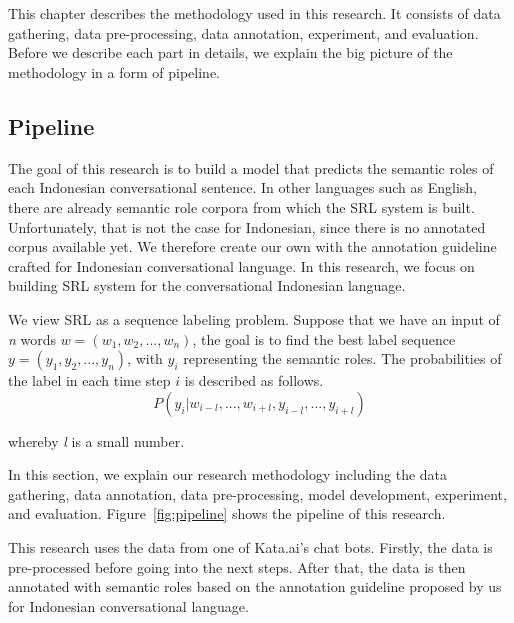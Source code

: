 \chapter{\babTiga}\label{bab:tiga}
This chapter describes the methodology used in this research. It consists of data gathering, data pre-processing, data annotation, experiment, and evaluation. Before we describe each part in details, we explain the big picture of the methodology in a form of pipeline.

\section{Pipeline}
The goal of this research is to build a model that predicts the semantic roles of each Indonesian conversational sentence. In other languages such as English, there are already semantic role corpora from which the SRL system is built. Unfortunately, that is not the case for Indonesian, since there is no annotated corpus available yet. We therefore create our own with the annotation guideline crafted for Indonesian conversational language. In this research, we focus on building SRL system for the conversational Indonesian language. 

We view SRL as a sequence labeling problem. Suppose that we have an input of \textit{n} words $w = (w_{1}, w_{2}, ..., w_{n})$, the goal is to find the best label sequence $y = (y_{1}, y_{2}, ..., y_{n})$, with $y_{i}$ representing the semantic roles. The probabilities of the label in each time step $i$ is described as follows.
\begin{equation}
P(y_{i}|w_{i-l}, ..., w_{i+l},y_{i-l}, ..., y_{i+l})
\end{equation}

whereby \textit{l} is a small number. 

In this section, we explain our research methodology including the data gathering, data annotation, data pre-processing, model development, experiment, and evaluation. Figure~\ref{fig:pipeline} shows the pipeline of this research.

This research uses the data from one of Kata.ai's chat bots. Firstly, the data is pre-processed before going into the next steps. After that, the data is then annotated with semantic roles based on the annotation guideline proposed by us for Indonesian conversational language.

